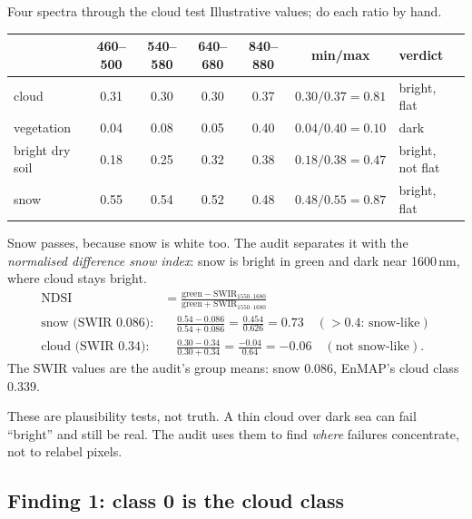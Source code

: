 \begin{worked}[label={we:seghead:plausible}]{Four spectra through the cloud test}
Illustrative values\tbrk\tagA; do each ratio by hand.
\begin{center}\small
\begin{tabular}{lcccccl}
\toprule
& 460--500 & 540--580 & 640--680 & 840--880 & min/max & verdict\\
\midrule
cloud & 0.31 & 0.30 & 0.30 & 0.37 & $0.30/0.37 = 0.81$ & bright, flat\\
vegetation & 0.04 & 0.08 & 0.05 & 0.40 & $0.04/0.40 = 0.10$ & dark\\
bright dry soil & 0.18 & 0.25 & 0.32 & 0.38 & $0.18/0.38 = 0.47$ & bright, not flat\\
snow & 0.55 & 0.54 & 0.52 & 0.48 & $0.48/0.55 = 0.87$ & bright, flat\\
\bottomrule
\end{tabular}
\end{center}
Snow passes, because snow is white too. The audit separates it with the \emph{normalised difference snow index}: snow is bright in green
and dark near 1600\,nm, where cloud stays bright.
\begin{align*}
  \text{NDSI} &= \frac{\text{green} - \text{SWIR}_{1550\text{--}1680}}{\text{green} + \text{SWIR}_{1550\text{--}1680}}\\
  \text{snow (SWIR 0.086):}&\quad \frac{0.54 - 0.086}{0.54 + 0.086} = \frac{0.454}{0.626} = 0.73 \quad (> 0.4\text{: snow-like})\\
  \text{cloud (SWIR 0.34):}&\quad \frac{0.30 - 0.34}{0.30 + 0.34} = \frac{-0.04}{0.64} = -0.06 \quad (\text{not snow-like}).
\end{align*}
The SWIR values are the audit's group means: snow 0.086, EnMAP's cloud class 0.339.
\end{worked}

These are plausibility tests, not truth. A thin cloud over dark sea can fail ``bright'' and still be real. The audit uses them to find \emph{where}
failures concentrate, not to relabel pixels.

\subsection{Finding 1: class 0 is the cloud class}

